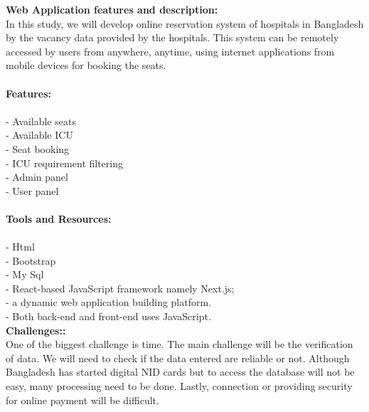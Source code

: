\documentclass{article}
\begin{document}
\Large{\textbf{Web Application features and description:}}\\

\large{In this study, we will develop online reservation system of hospitals in Bangladesh by the vacancy data provided by the hospitals. This system can be remotely accessed by users from anywhere, anytime, using internet applications from mobile devices for booking the seats.}\\
\vspace{15pt}\\
\Large{\textbf{Features:}}
\\
\\\large{- Available seats\\
- Available ICU\\
- Seat booking\\
- ICU requirement filtering\\
- Admin panel\\ 
- User panel}\\
\vspace{15pt}\\
\Large{\textbf{Tools and Resources:}}
\\
\\\large{- Html\\
- Bootstrap\\
- My Sql\\
- React-based JavaScript framework namely Next.js;\\
- a dynamic web application building platform.\\
- Both back-end and front-end uses JavaScript.}\\

\Large{\textbf{Challenges::}}\\

\large{One of the biggest challenge is time. The main challenge will be the verification of data. We will need to check if the data entered are reliable or not. Although Bangladesh has started digital NID cards but to access the database will not be easy, many processing need to be done. Lastly, connection or providing security for online payment will be difficult.}\\
\end{document}

